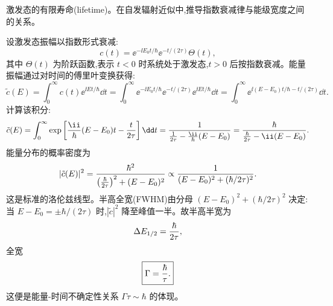 \begin{question}
激发态的有限寿命(lifetime)。在自发辐射近似中,推导指数衰减律与能级宽度之间的关系。
\end{question}
\begin{solution}
设激发态振幅以指数形式衰减:
\[
c(t)=\ee^{-\ii E_0t/\hbar}\ee^{-t/(2\tau)}\Theta(t),
\]
其中 $\Theta(t)$ 为阶跃函数,表示 $t<0$ 时系统处于激发态,$t>0$ 后按指数衰减。能量振幅通过对时间的傅里叶变换获得:
\[
\tilde c(E)=\int_0^\infty c(t)\ee^{\ii Et/\hbar}\dd t
=\int_0^\infty \ee^{-\ii E_0t/\hbar}\ee^{-t/(2\tau)}\ee^{\ii Et/\hbar}\dd t
=\int_0^\infty \ee^{\ii(E-E_0)t/\hbar-t/(2\tau)}\dd t.
\]
计算该积分:
\[
\tilde c(E)=\int_0^\infty
\exp\left[{\ii\over\hbar}(E-E_0)t-{t\over2\tau}\right]\dd t
={1\over{1\over2\tau}-{\ii\over\hbar}(E-E_0)}
={\hbar\over{\hbar\over2\tau}-\ii(E-E_0)}.
\]
能量分布的概率密度为
\[
|\tilde c(E)|^2={\hbar^2\over\left({\hbar\over2\tau}\right)^2+(E-E_0)^2}
\propto{1\over(E-E_0)^2+(\hbar/2\tau)^2}.
\]
这是标准的洛伦兹线型。半高全宽(FWHM)由分母 $(E-E_0)^2+(\hbar/2\tau)^2$ 决定:当 $E-E_0=\pm\hbar/(2\tau)$ 时,$|\tilde c|^2$ 降至峰值一半。故半高半宽为
\[
\Delta E_{1/2}={\hbar\over2\tau},
\]
全宽
\[
\boxed{\Gamma={\hbar\over\tau}.}
\]
这便是能量-时间不确定性关系 $\Gamma\tau\sim\hbar$ 的体现。
\end{solution}

